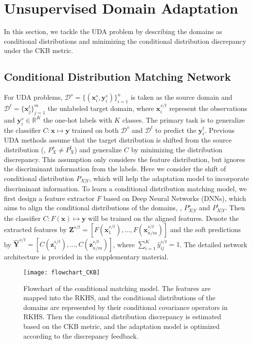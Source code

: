 \documentclass[final]{cvpr}
\newcommand{\MC}{\mathcal}
\newcommand{\MBB}{\mathbb}
\newcommand{\MBF}{\mathbf}
\begin{document}
\section{Unsupervised Domain Adaptation}
In this section, we tackle the UDA problem by describing the domains as conditional distributions and minimizing the conditional distribution discrepancy under the CKB metric.
\subsection{Conditional Distribution Matching Network}
For UDA problems, $\MC{D}^{s} = \{ (\MBF{x}^s_i,\MBF{y}^s_i) \}_{i=1}^{n}$ is taken as the source domain and $\MC{D}^{t} = \{ \MBF{x}^t_j \}_{j=1}^{m}$ the unlabeled target domain, where $\MBF{x}^{s/t}_i$ represent the observations and $\MBF{y}^{s}_i \in \MBB{R}^{K}$ the one-hot labels with $K$ classes. The primary task is to generalize the classifier $C: \MBF{x} \mapsto \MBF{y}$ trained on both $\MC{D}^{s}$ and $\MC{D}^{t}$ to predict the $\MBF{y}^t_i$. Previous UDA methods assume that the target distribution is shifted from the source distribution (\ie, $P_X^s \neq P_X^t$) and generalize $C$ by minimizing the distribution discrepancy. This assumption only considers the feature distribution, but ignores the discriminant information from the labels. Here we consider the shift of conditional distribution $P_{X|Y}$, which will help the adaptation model to incorporate discriminant information. To learn a conditional distribution matching model, we first design a feature extractor $F$ based on Deep Neural Networks (DNNs), which aims to align the conditional distributions of the domains, \ie, $P_{X|Y}^s$ and $P_{X|Y}^t$. Then the classifier $C: F(\MBF{x}) \mapsto \MBF{y}$ will be trained on the aligned features. Denote the extracted features by $\MBF{Z}^{s/t} = [F(\MBF{x}_1^{s/t}),\ldots,F(\MBF{x}_{n/m}^{s/t})]$ and the soft predictions by $\hat{\MBF{Y}}^{s/t} = [C(\MBF{z}_1^{s/t}),\ldots,C(\MBF{z}_{n/m}^{s/t})]$, where $\sum_{i=1}^{K} \hat{y}^{s/t}_{ij}=1$. The detailed network architecture is provided in the supplementary material.

\begin{figure}
    \centering
    \texttt{[image: flowchart\_CKB]}
    \caption{Flowchart of the conditional matching model. The features are mapped into the RKHS, and the conditional distributions of the domains are represented by their conditional covariance operators in RKHS. Then the conditional distribution discrepancy is estimated based on the CKB metric, and the adaptation model is optimized according to the discrepancy feedback.}\label{fig:flowchart_CKB}
    \vspace{-3pt}
\end{figure}
\end{document}
